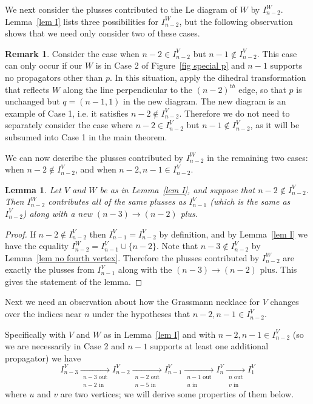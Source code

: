 \documentclass[11pt]{article}
\newtheorem{lem}[thm]{Lemma}
\theoremstyle{remark}
\theoremstyle{definition}
\newtheorem{rmk}[thm]{Remark}
\begin{document}
We next consider the plusses contributed to the Le diagram of $W$ by $I_{n-2}^W$. Lemma~\ref{lem I} lists three possibilities for $I_{n-2}^W$, but the following observation shows that we need only consider two of these cases.

\begin{rmk}\label{rem n-2 case} Consider the case when $n-2 \in I_{n-2}^V$ but $n-1 \not\in I_{n-2}^V$. This case can only occur if our $W$ is in Case 2 of Figure~\ref{fig special p} and $n-1$ supports no propagators other than $p$. In this situation, apply the dihedral transformation that reflects $W$ along the line perpendicular to the $(n-2)^{th}$ edge, so that $p$ is unchanged but $q = (n-1,1)$ in the new diagram. The new diagram is an example of Case 1, i.e. it satisfies $n-2 \not \in I_{n-2}^V$. Therefore we do not need to separately consider the case where $n-2\in I_{n-2}^V$ but $n-1\not\in I_{n-2}^V$, as it will be subsumed into Case 1 in the main theorem.
\end{rmk}

We can now describe the plusses contributed by $I_{n-2}^W$ in the remaining two cases: when $n-2 \not\in I_{n-2}^V$, and when $n-2,n-1 \in I_{n-2}^V$.

\begin{lem}\label{lem n-2 good}
  Let $V$ and $W$ be as in Lemma~\ref{lem I}, and suppose that $n-2 \not\in I_{n-2}^{V}$. Then $I_{n-2}^{W}$ contributes all of the same plusses as $I_{n-1}^{V}$ (which is the same as $I_{n-2}^{V}$) along with a new ${(n-3)\rightarrow (n-2)}$ plus.
\end{lem}


\begin{proof}
If $n-2\not\in I_{n-2}^{V}$ then $I_{n-1}^{V}=I_{n-2}^{V}$ by definition, and by Lemma~\ref{lem I} we have the equality ${I_{n-2}^{W} = I_{n-1}^{V} \cup \{n-2\}}$.  Note that $n-3\not\in I_{n-2}^{V}$ by Lemma~\ref{lem no fourth vertex}.  Therefore the plusses contributed by $I_{n-2}^{W}$ are exactly the  plusses from $I_{n-1}^{V}$ along with the $(n-3)\rightarrow (n-2)$ plus.  This gives the statement of the lemma.
\end{proof}

Next we need an observation about how the Grassmann necklace for $V$ changes over the indices near $n$ under the hypotheses that $n-2, n-1\in I_{n-2}^V$.

Specifically with $V$ and $W$ as in Lemma~\ref{lem I} and with $n-2, n-1\in I_{n-2}^V$ (so we are necessarily in Case 2 and $n-1$ supports at least one additional propagator) we have
  \begin{equation}\label{eq necklace}
  I_{n-3}^{V} \xrightarrow[\substack{n-3\text{ out}\\n-2\text{ in}}]{} I_{n-2}^{V} \xrightarrow[\substack{n-2\text{ out}\\n-5\text{ in}}]{} I_{n-1}^{V} \xrightarrow[\substack{n-1\text{ out}\\ u \text{ in}}]{} I_{n}^{V}  \xrightarrow[\substack{n \text{ out}\\v \text{ in}}]{} I_1^{V}
  \end{equation}
where $u$ and $v$ are two vertices; we will derive some properties of them below.
\end{document}
